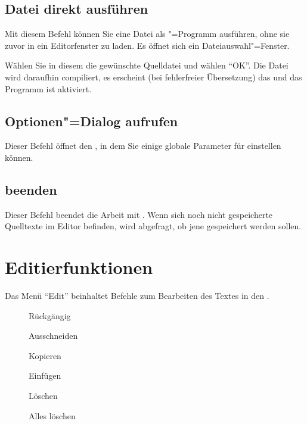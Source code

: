 \subsection{Datei direkt ausführen}
\label{sec:MI_EXECUTE}

Mit diesem Befehl können Sie eine Datei als \mutabor{}"=Programm
ausführen, ohne sie zuvor in ein Editorfenster zu laden. Es öffnet
sich ein Dateiauswahl"=Fenster.


Wählen Sie in diesem die gewünschte Quelldatei und wählen "`OK"'. Die
Datei wird daraufhin compiliert, es erscheint (bei fehlerfreier
Übersetzung) das  und das
Programm ist aktiviert.

\subsection{Optionen"=Dialog aufrufen}\label{sec:MI_SETUP}

Dieser Befehl öffnet den , in 
dem Sie einige globale Parameter für \mutabor{} einstellen 
können.


\subsection{\texorpdfstring{\mutabor{}}{Mutabor} beenden}
\label{sec:MI_EXIT}

Dieser Befehl beendet die Arbeit mit \mutabor{}. Wenn sich noch nicht
gespeicherte Quelltexte im Editor befinden, wird abgefragt, ob jene
gespeichert werden sollen.



\section{Editierfunktionen}\label{sec:MS_EDIT}
Das Menü "`Edit"' beinhaltet Befehle zum Bearbeiten des Textes 
in den .

\begin{description}
\item[] Rückgängig
\item[] Ausschneiden
\item[] Kopieren
\item[] Einfügen
\item[] Löschen
\item[] Alles löschen
\end{description}

